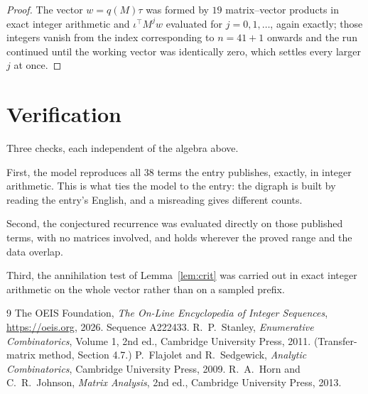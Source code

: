 \documentclass[11pt,a4paper]{article}
\theoremstyle{plain}
\theoremstyle{definition}
\begin{document}
\begin{proof}
The vector $w=q(M)\tau$ was formed by $19$ matrix--vector products in exact integer
arithmetic and $\iota^{\!\top}M^{j}w$ evaluated for $j=0,1,\dots$, again exactly; those
integers vanish from the index corresponding to $n=41+1$ onwards and the run continued
until the working vector was identically zero, which settles every larger $j$ at once.
\end{proof}

\section{Verification}

Three checks, each independent of the algebra above.

First, the model reproduces all $38$ terms the entry publishes, exactly, in integer
arithmetic. This is what ties the model to the entry: the digraph is built by reading the
entry's English, and a misreading gives different counts.

Second, the conjectured recurrence was evaluated directly on those published terms, with no
matrices involved, and holds wherever the proved range and the data overlap.

Third, the annihilation test of Lemma~\ref{lem:crit} was carried out in exact integer
arithmetic on the whole vector rather than on a sampled prefix.

\begin{thebibliography}{9}
 The OEIS Foundation, \emph{The On-Line Encyclopedia of Integer
Sequences}, \url{https://oeis.org}, 2026. Sequence A222433.
 R.~P.~Stanley, \emph{Enumerative Combinatorics}, Volume 1, 2nd ed.,
Cambridge University Press, 2011. (Transfer-matrix method, Section 4.7.)
 P.~Flajolet and R.~Sedgewick, \emph{Analytic Combinatorics}, Cambridge
University Press, 2009.
 R.~A.~Horn and C.~R.~Johnson, \emph{Matrix Analysis}, 2nd ed., Cambridge
University Press, 2013.
\end{thebibliography}
\end{document}
